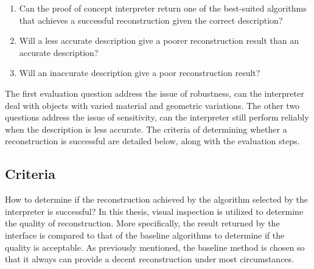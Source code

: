 \begin{enumerate}
\item Can the proof of concept interpreter return one of the best-suited algorithms that achieves a successful reconstruction given the correct description?
\item Will a less accurate description give a poorer reconstruction result than an accurate description?
\item Will an inaccurate description give a poor reconstruction result?
\end{enumerate}
The first evaluation question address the issue of robustness, \ie can the interpreter deal with objects with varied material and geometric variations. The other two questions address the issue of sensitivity, \ie can the interpreter still perform reliably when the description is less accurate. The criteria of determining whether a reconstruction is successful are detailed below, along with the evaluation steps.

\subsection{Criteria}
How to determine if the reconstruction achieved by the algorithm selected by the interpreter is successful? In this thesis, visual inspection is utilized to determine the quality of reconstruction. More specifically, the result returned by the interface is compared to that of the baseline algorithms to determine if the quality is acceptable. As previously mentioned, the baseline method is chosen so that it always can provide a decent reconstruction under most circumstances.

